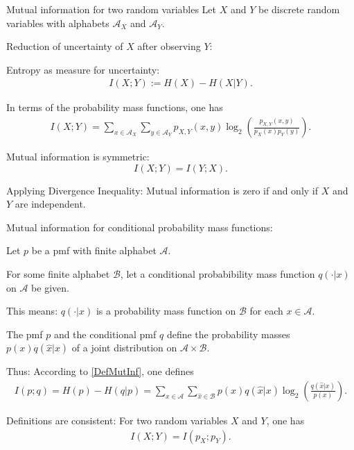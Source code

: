 \begin{frame}{Mutual information for two random variables}
Let $X$ and $Y$ be discrete random variables with alphabets $\mathcal{A}_X$ and $\mathcal{A}_Y$.

\bit
\item Reduction of uncertainty of $X$ after observing $Y$: 
\item[\iarrow] Entropy as measure for uncertainty: 
\begin{align}\label{DefMutInf}
I(X;Y):=H(X)-H(X|Y). 
\end{align}  
\item In terms of the probability mass functions, one has 
\begin{align*}
I(X;Y)=\sum_{x\in\mathcal{A}_X}\sum_{y\in\mathcal{A}_Y}p_{X,Y}(x,y)\log_2\left(\frac{p_{X,Y}(x,y)}{p_{X}(x)p_{Y}(y)}\right). 
\end{align*}
\item[\iarrow] Mutual information is symmetric:
\[
I(X;Y)=I(Y;X).
\]
\item[\iarrow]  Applying Divergence Inequality: Mutual information is zero if and only if $X$ and $Y$ are independent. 
\eit
\end{frame}
\begin{frame}{Mutual information for conditional probability mass functions:} 
\bit
\item Let $p$ be a pmf with finite alphabet $\mathcal{A}$. 
\item For some finite alphabet $\mathcal{B}$, let a conditional probabibility mass function $q(\cdot|x)$ on $\mathcal{A}$ be given. 
\item This means: $q(\cdot|x)$ is a probability mass function on $\mathcal{B}$ for 
each $x\in\mathcal{A}$. 
\item The pmf $p$ and the conditional pmf $q$ define the probability masses $p(x)q(\hat{x}|x)$ of a joint distribution on $\mathcal{A}\times\mathcal{B}$.
\item[\iarrow] Thus: According to \eqref{DefMutInf}, one defines
\begin{align*}
I(p;q)=H(p)-H(q|p)=\sum_{x\in\mathcal{A}}\sum_{\hat{x}\in\mathcal{B}}p(x)q(\hat{x}|x)\log_2\left(\frac{q(\hat{x}|x)}{p(x)}\right).
\end{align*}
\item Definitions are consistent: For two random variables $X$ and $Y$, one has
\begin{align*}
I(X;Y)=I(p_X;p_Y). 
\end{align*}
\eit 
\end{frame}

